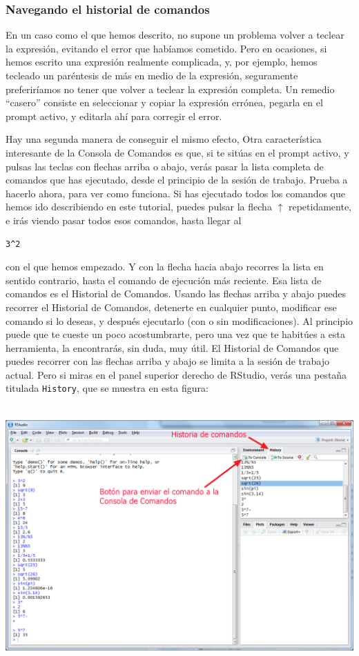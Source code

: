 \documentclass[10pt,a4paper]{article}\usepackage[]{graphicx}\usepackage[]{color}
\newcounter {cont01}
\begin{document}
\subsubsection*{Navegando el historial de comandos}

En un caso como el que hemos descrito, no supone un problema volver a teclear la expresión, evitando el error que habíamos cometido. Pero en ocasiones, si hemos escrito una expresión realmente complicada, y, por ejemplo, hemos tecleado un paréntesis de más en medio de la expresión, seguramente preferiríamos no tener que volver a teclear la expresión completa. Un remedio ``casero'' consiste en seleccionar y copiar la expresión errónea, pegarla en el prompt activo, y editarla ahí para corregir el error.

Hay una segunda manera de conseguir el mismo efecto, Otra característica interesante de la Consola de Comandos es que, si te sitúas en el prompt activo, y pulsas las teclas con flechas arriba o abajo, verás pasar la lista completa de comandos que has ejecutado,  desde el principio de la sesión de trabajo. Prueba a hacerlo ahora, para ver como funciona. Si has ejecutado todos los comandos que hemos ido describiendo en este tutorial, puedes pulsar la flecha $\uparrow$ repetidamente, e irás viendo pasar todos esos comandos, hasta llegar al
\begin{verbatim}
3^2
\end{verbatim}
con el que hemos empezado. Y con la flecha hacia abajo recorres la lista en sentido contrario, hasta el comando de ejecución más reciente. Esa lista de comandos es el {\sf Historial de Comandos}. Usando las flechas arriba y abajo puedes recorrer el Historial de Comandos, detenerte en cualquier punto, modificar ese comando si lo deseas, y después ejecutarlo (con o sin modificaciones). Al principio puede que te cueste un poco acostumbrarte, pero una vez que te habitúes a esta herramienta, la encontrarás, sin duda, muy útil.
El Historial de Comandos que puedes recorrer con las flechas arriba y abajo se limita a la sesión de trabajo actual. Pero si miras en el panel superior derecho de RStudio, verás una pestaña titulada {\tt History}, que se muestra en esta figura:
    \begin{center}
    \includegraphics[height=10cm]{../fig/Tut02-04.png}
    \end{center}
\end{document}
